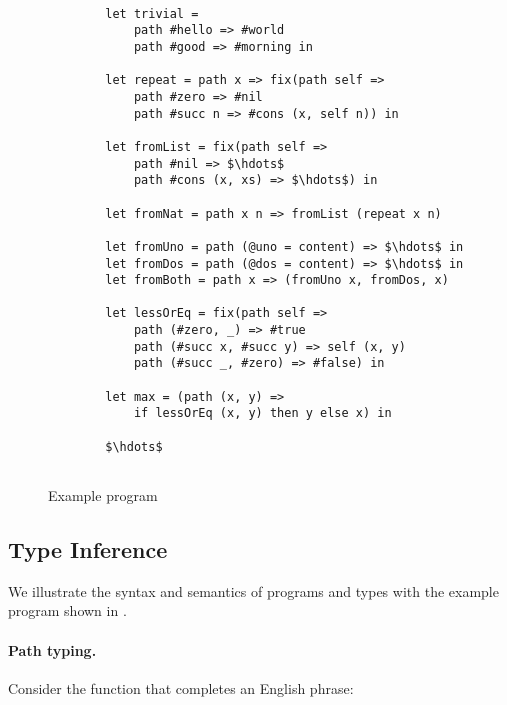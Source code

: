 \documentclass[acmsmall]{acmart}
\theoremstyle{definition}
\begin{document}
\begin{figure*}[h]

    \begin{lstlisting}[mathescape=true]

        let trivial =
            path #hello => #world
            path #good => #morning in

        let repeat = path x => fix(path self =>
            path #zero => #nil
            path #succ n => #cons (x, self n)) in

        let fromList = fix(path self =>
            path #nil => $\hdots$
            path #cons (x, xs) => $\hdots$) in

        let fromNat = path x n => fromList (repeat x n)

        let fromUno = path (@uno = content) => $\hdots$ in
        let fromDos = path (@dos = content) => $\hdots$ in
        let fromBoth = path x => (fromUno x, fromDos, x)

        let lessOrEq = fix(path self =>
            path (#zero, _) => #true
            path (#succ x, #succ y) => self (x, y)
            path (#succ _, #zero) => #false) in

        let max = (path (x, y) => 
            if lessOrEq (x, y) then y else x) in

        $\hdots$


    \end{lstlisting}

\caption{Example program}
\label{fig:program}
\end{figure*}


\subsection{Type Inference}




We illustrate the syntax and semantics of programs and types with the example program shown in .

\paragraph{Path typing.}
Consider the function  that completes an English phrase:
\end{document}
